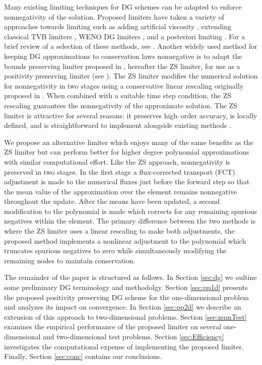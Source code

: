 \documentclass{ametsoc}
\begin{document}
Many existing limiting techniques for DG schemes can be adapted to enforce nonnegativity of the solution. Proposed limiters have taken a variety of approaches towards limiting such as adding artificial viscosity \citep{hartmann2002,persson2006}, extending classical TVB limiters \citep{cbShuRKDG-2,cbShuRKDG-3}, WENO DG limiters \citep{qiu-WENODG-1,qiu-WENODG-2,qiu-WENODG-3}, and a posteriori limiting \citep{dumbser2015}. For a brief review of a selection of these methods, see \citet{dumbser2015}. Another widely used method for keeping DG approximations to conservation laws nonnegative is to adapt the bounds preserving limiter proposed in \citet{Zhang2010,Zhang:2011aa}, hereafter the ZS limiter, for use as a positivity preserving limiter (see \citet{Rossmanith:2011aa,Qiu:2011aa,Guo:2013aa}). The ZS limiter modifies the numerical solution for nonnegativity in two stages using a conservative linear rescaling originally proposed in \citet{Liu:1996aa}. When combined with a suitable time step condition, the ZS rescaling guarantees the nonnegativity of the approximate solution. The ZS limiter is attractive for several reasons: it preserves high--order accuracy, is locally defined, and is straightforward to implement alongside existing methods \citep{Zhang2010}. 

We propose an alternative limiter which enjoys many of the same benefits as the ZS limiter but can perform better for higher degree polynomial approximations with similar computational effort. Like the ZS approach, nonnegativity is preserved in two stages. In the first stage a flux-corrected transport (FCT) adjustment is made to the numerical fluxes just before the forward step so that the mean value of the approximation over the element remains nonnegative throughout the update. After the means have been updated, a second modification to the polynomial is made which corrects for any remaining spurious negatives within the element. The primary difference between the two methods is where the ZS limiter uses a linear rescaling to make both adjustments, the proposed method implements a nonlinear adjustment to the polynomial which truncates spurious negatives to zero while simultaneously modifying the remaining nodes to maintain conservation. 

The remainder of the paper is structured as follows. In Section \ref{sec:dg} we oultine some preliminary DG terminology and methodolgy. Section \ref{sec:pp1d} presents the proposed positivity preserving DG scheme for the one-dimensional problem and analyzes its impact on convergence. In Section \ref{sec:pp2d} we describe an extension of this approach to two-dimensional problems. Section \ref{sec:numTest} examines the empirical performance of the proposed limiter on several one-dimensional and two-dimensional test problems. Section \ref{sec:Efficiency} investigates the computational expense of implementing the proposed limiter. Finally, Section \ref{sec:conc} contains our conclusions.
\end{document}
